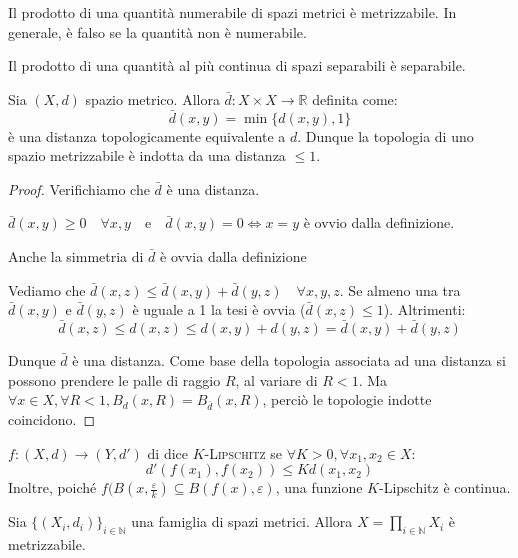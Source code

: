 \documentclass{article}
\begin{document}
\begin{nlist}
\item Il prodotto di una quantità numerabile di spazi metrici è metrizzabile. In
generale, è falso se la quantità non è numerabile.
\item Il prodotto di una quantità al più continua di spazi separabili è
separabile.
\end{nlist}
\begin{prop}
	Sia $(X,d)$ spazio metrico. Allora $\bar{d}:X \times X \longrightarrow
	\mathbb{R}$ definita come:
	$$\bar{d}(x,y)=\min \{d(x,y),1\}$$
	è una distanza topologicamente equivalente a $d$. Dunque la topologia di uno
	spazio metrizzabile è indotta da una distanza $\le 1$.
\end{prop}
\begin{proof}
	Verifichiamo che $\bar{d}$ è una distanza. \\
	\begin{nlist}
	\item $\bar{d}(x,y) \ge 0 \quad \forall x,y \quad \text{e} \quad
	\bar{d}(x,y)=0 \Leftrightarrow x=y$ è ovvio dalla definizione.
	\item Anche la simmetria di $\bar{d}$ è ovvia dalla definizione
	\item Vediamo che $\bar{d}(x,z) \le \bar{d}(x,y)+\bar{d}(y,z) \quad \forall
	x,y,z$. Se almeno una tra $\bar{d}(x,y)$ e $\bar{d}(y,z)$ è uguale a 1
	la tesi è ovvia ($\bar{d}(x,z) \le 1$). Altrimenti:
	$$\bar{d}(x,z) \le d(x,z) \le d(x,y)+ d(y,z) =\bar{d}(x,y)+\bar{d}(y,z)$$
	\end{nlist}
	Dunque $\bar{d}$ è una distanza. Come base della topologia associata ad una
	distanza si possono prendere le palle di raggio $R$, al	variare di $R<1$.
	Ma $\forall x \in X, \forall R<1, B_d(x,R)=B_{\bar{d}}(x,R)$, perciò le
	topologie indotte coincidono.
\end{proof}
\begin{defn}
	$f:(X,d) \longrightarrow (Y,d')$ di dice $K$-\textsc{Lipschitz} se $\forall
	K>0,\forall x_1,x_2 \in X$:
	$$d'(f(x_1),f(x_2)) \le Kd(x_1,x_2)$$
	Inoltre, poiché $f(B(x,\frac{\varepsilon}{k}) \subseteq
	B(f(x),\varepsilon)$, una funzione $K$-Lipschitz è continua.
\end{defn}
\begin{thm}
Sia $\{(X_i,d_i)\}_{i \in \mathbb{N}}$ una famiglia di spazi metrici. Allora
$X=\prod _{i \in \mathbb{N}} X_i$ è metrizzabile.
\end{thm}
\end{document}
